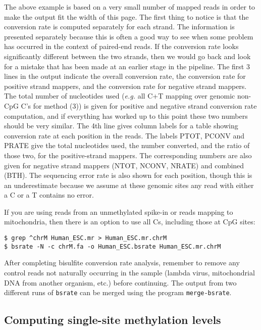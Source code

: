 \documentclass[10pt]{article}
\newcommand{\prog}[1]{\texttt{#1}}
\begin{document}
\noindent
The above example is based on a very small number of mapped reads in
order to make the output fit the width of this page.  The first thing
to notice is that the conversion rate is computed separately for each
strand. The information is presented separately because this is often
a good way to see when some problem has occurred in the context of
paired-end reads. If the conversion rate looks significantly different
between the two strands, then we would go back and look for a mistake
that has been made at an earlier stage in the pipeline. The first 3
lines in the output indicate the overall conversion rate, the
conversion rate for positive strand mappers, and the conversion rate
for negative strand mappers. The total number of nucleotides used
({\em e.g.} all C+T mapping over genomic non-CpG C's for method (3)) is
given for positive and negative strand conversion rate computation,
and if everything has worked up to this point these two numbers should
be very similar. The 4th line gives column labels for a table showing
conversion rate at each position in the reads.  The labels PTOT, PCONV
and PRATE give the total nucleotides used, the number converted, and
the ratio of those two, for the positive-strand mappers. The
corresponding numbers are also given for negative strand mappers
(NTOT, NCONV, NRATE) and combined (BTH). The sequencing error rate is
also shown for each position, though this is an underestimate because
we assume at these genomic sites any read with either a C or a T
contains no error.

If you are using reads from an unmethylated spike-in or reads mapping
to mitochondria, then there is an option to use all Cs, including those
at CpG sites:
\begin{verbatim}
$ grep ^chrM Human_ESC.mr > Human_ESC.mr.chrM
$ bsrate -N -c chrM.fa -o Human_ESC.bsrate Human_ESC.mr.chrM
\end{verbatim}

After completing bisulfite conversion rate analysis, remember to
remove any control reads not naturally occurring in the sample
(lambda virus, mitochondrial DNA from another organism, etc.)
before continuing. The output from two different runs of \prog{bsrate}
can be merged using the program \prog{merge-bsrate}.

\subsection{Computing single-site methylation levels}
\label{sec:estim-methyl-freq}
\end{document}
